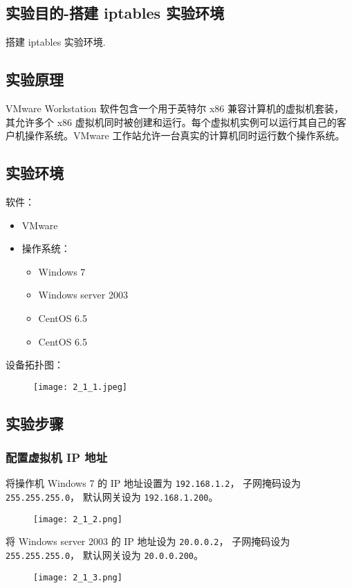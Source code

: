 \subsection{实验目的-搭建 iptables 实验环境}
搭建 iptables 实验环境.
%
\subsection{实验原理}
VMware Workstation 软件包含一个用于英特尔 x86 兼容计算机的虚拟机套装，
其允许多个 x86 虚拟机同时被创建和运行。每个虚拟机实例可以运行其自己的客
户机操作系统。VMware 工作站允许一台真实的计算机同时运行数个操作系统。
%
\subsection{实验环境}
软件：
\begin{itemize}
  \item VMware
  \item 操作系统：
    \begin{itemize}
      \item Windows 7
      \item Windows server 2003
      \item CentOS 6.5
      \item CentOS 6.5
    \end{itemize}
\end{itemize}
%
设备拓扑图：
\begin{figure}[H]
  \begin{center}
    \texttt{[image: 2\_1\_1.jpeg]}
  \end{center}
\end{figure}
%
\subsection{实验步骤}
\subsubsection{配置虚拟机 IP 地址}
将操作机 Windows 7 的 IP 地址设置为 \texttt{192.168.1.2}，
子网掩码设为 \texttt{255.255.255.0}，
默认网关设为 \texttt{192.168.1.200}。
\begin{figure}[H]
  \begin{center}
    \texttt{[image: 2\_1\_2.png]}
  \end{center}
\end{figure}

将 Windows server 2003 的 IP 地址设为 \texttt{20.0.0.2}，
子网掩码设为 \texttt{255.255.255.0}，
默认网关设为 \texttt{20.0.0.200}。
\begin{figure}[H]
  \begin{center}
    \texttt{[image: 2\_1\_3.png]}
  \end{center}
\end{figure}

